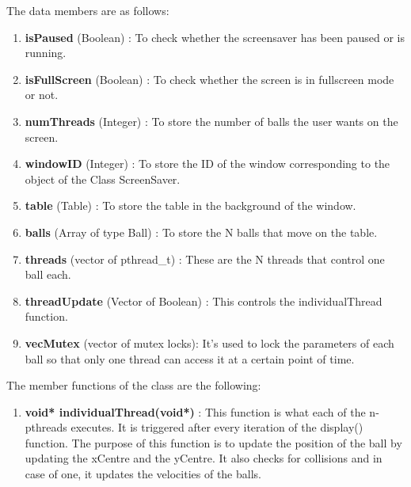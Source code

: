 \documentclass[]{article}
\begin{document}
\begin{itemize}
\begin{flushleft}
The data members are as follows: \\

\begin{enumerate}

\item \textbf{isPaused} (Boolean) : To check whether the screensaver has been paused or is running.

\item \textbf{isFullScreen} (Boolean) : To check whether the screen is in fullscreen mode or not.

\item \textbf{numThreads} (Integer) : To store the number of balls the user wants on the screen.

\item \textbf{windowID} (Integer) : To store the ID of the window corresponding to the object of the Class ScreenSaver.

\item \textbf{table} (Table) : To store the table in the background of the window.

\item \textbf{balls} (Array of type Ball) : To store the N balls that move on the table.

\item \textbf{threads} (vector of pthread\_t) : These are the N threads that control one ball each.

\item \textbf{threadUpdate} (Vector of Boolean) : This controls the individualThread function.

\item \textbf{vecMutex} (vector of mutex locks): It's used to lock the parameters of each ball so that only one thread can access it at a certain point of time. 

\end{enumerate}


The member functions of the class are the following:

\begin{enumerate}

\item \textbf{ void* individualThread(void*)} : This function is what each of the n-pthreads executes. It is triggered after every iteration of the display() function. The purpose of this function is to update the position of the ball by updating the xCentre and the yCentre. It also checks for collisions and in case of one, it updates the velocities of the balls. 


\end{enumerate}
\end{flushleft}
\end{itemize}
\end{document}
